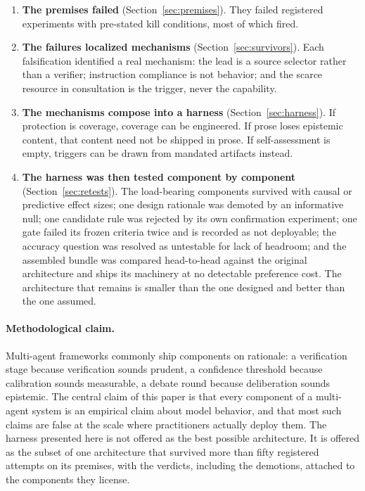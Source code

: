 \documentclass[11pt]{article}
\begin{document}
\begin{enumerate}
\item \textbf{The premises failed} (Section~\ref{sec:premises}). They
failed registered experiments with pre-stated kill conditions, most of
which fired.
\item \textbf{The failures localized mechanisms}
(Section~\ref{sec:survivors}). Each falsification identified a real
mechanism: the lead is a source selector rather than a verifier;
instruction compliance is not behavior; and the scarce resource in
consultation is the trigger, never the capability.
\item \textbf{The mechanisms compose into a harness}
(Section~\ref{sec:harness}). If protection is coverage, coverage can be
engineered. If prose loses epistemic content, that content need not be
shipped in prose. If self-assessment is empty, triggers can be drawn
from mandated artifacts instead.
\item \textbf{The harness was then tested component by component}
(Section~\ref{sec:retests}). The load-bearing components survived with
causal or predictive effect sizes; one design rationale was demoted by
an informative null; one candidate rule was rejected by its own
confirmation experiment; one gate failed its frozen criteria twice and
is recorded as not deployable; the accuracy question was resolved as
untestable for lack of headroom; and the assembled bundle was compared
head-to-head against the original architecture and ships its machinery
at no detectable preference cost. The architecture that remains is
smaller than the one designed and better than the one assumed.
\end{enumerate}

\paragraph{Methodological claim.} Multi-agent frameworks commonly ship
components on rationale: a verification stage because verification
sounds prudent, a confidence threshold because calibration sounds
measurable, a debate round because deliberation sounds epistemic. The
central claim of this paper is that every component of a multi-agent
system is an empirical claim about model behavior, and that most such
claims are false at the scale where practitioners actually deploy them.
The harness presented here is not offered as the best possible
architecture. It is offered as the subset of one architecture that
survived more than fifty registered attempts on its premises, with the
verdicts, including the demotions, attached to the components they
license.
\end{document}
